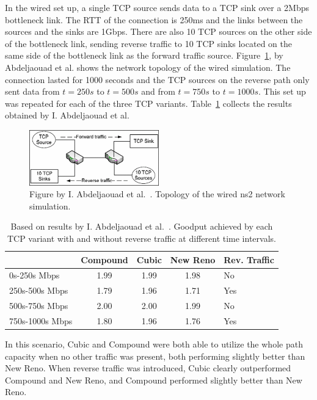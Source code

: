 In the wired set up, a single TCP source sends data to a TCP sink over a 2Mbps bottleneck link. The RTT of the connection is 250ms and the links between the sources and the sinks are 1Gbps. There are also 10 TCP sources on the other side of the bottleneck link, sending reverse traffic to 10 TCP sinks located on the same side of the bottleneck link as the forward traffic source. Figure~\ref{fig:topology1}, by Abdeljaouad et al. shows the network topology of the wired simulation. The connection lasted for 1000 seconds and the TCP sources on the reverse path only sent data from $t=250s$ to $t=500s$ and from $t=750s$ to $t=1000s$. This set up was repeated for each of the three TCP variants. Table~\ref{tab:goodput1} collects the results obtained by  I. Abdeljaouad et al.

\begin{figure}
	\includegraphics[width=0.5\textwidth]{images/abdeljaouad10_topology_1.png}
	\caption{Figure by I. Abdeljaouad et al.~\cite{Abdeljaouad10}. Topology of the wired ns2 network simulation.}
	\label{fig:topology1}
\end{figure}

\begin{table}
\small
\begin{tabular}{l*{3}{c}l}
& Compound & Cubic & New Reno & Rev. Traffic \\
\hline
0s-250s Mbps & 1.99 & 1.99 & 1.98 & No \\
250s-500s Mbps & 1.79 & 1.96 & 1.71 & Yes \\
500s-750s Mbps & 2.00 & 2.00 & 1.99 & No \\
750s-1000s Mbps & 1.80 & 1.96 & 1.76 & Yes \\
\end{tabular}
\caption{Based on results by I. Abdeljaouad et al.~\cite{Abdeljaouad10}. Goodput achieved by each TCP variant with and without reverse traffic at different time intervals.}
\label{tab:goodput1}
\end{table}

In this scenario, Cubic and Compound were both able to utilize the whole path capacity when no other traffic was present, both performing slightly better than New Reno. When reverse traffic was introduced, Cubic clearly outperformed Compound and New Reno, and Compound performed slightly better than New Reno.  

